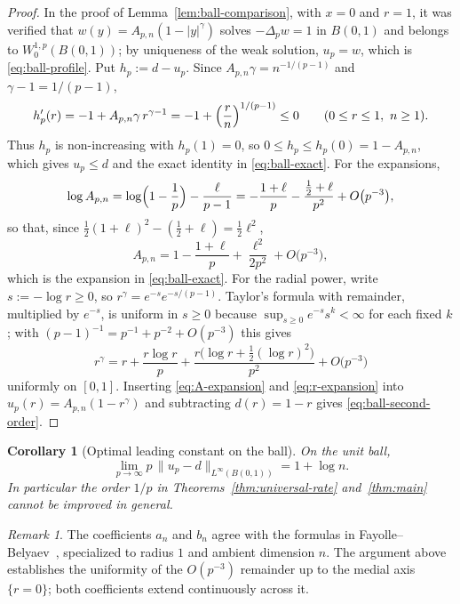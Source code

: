 \documentclass[11pt]{article}
\newcommand{\abs}[1]{\lvert #1\rvert}
\newcommand{\norm}[1]{\lVert #1\rVert}
\newtheorem{corollary}[theorem]{Corollary}
\theoremstyle{definition}
\theoremstyle{remark}
\newtheorem{remark}[theorem]{Remark}
\begin{document}
\begin{proof}
In the proof of Lemma~\ref{lem:ball-comparison}, with $x=0$ and $r=1$, it
was verified that $w(y)=A_{p,n}(1-\abs{y}^{\gamma})$ solves $-\Delta_pw=1$ in
$B(0,1)$ and belongs to $W^{1,p}_0(B(0,1))$; by uniqueness of the weak
solution, $u_p=w$, which is \eqref{eq:ball-profile}. Put $h_p:=d-u_p$. Since
$A_{p,n}\gamma=n^{-1/(p-1)}$ and $\gamma-1=1/(p-1)$,
\[
h_p'(r)=-1+A_{p,n}\gamma\,r^{\gamma-1}=-1+\Bigl(\frac rn\Bigr)^{1/(p-1)}\le0
\qquad(0\le r\le1,\ n\ge1).
\]
Thus $h_p$ is non-increasing with $h_p(1)=0$, so $0\le h_p\le h_p(0)=1-A_{p,n}$,
which gives $u_p\le d$ and the exact identity in \eqref{eq:ball-exact}. For
the expansions,
\[
\log A_{p,n}=\log\Bigl(1-\frac1p\Bigr)-\frac{\ell}{p-1}
=-\frac{1+\ell}{p}-\frac{\tfrac12+\ell}{p^{2}}+O\bigl(p^{-3}\bigr),
\]
so that, since $\tfrac12(1+\ell)^2-(\tfrac12+\ell)=\tfrac12\ell^{2}$,
\begin{equation}\label{eq:A-expansion}
A_{p,n}=1-\frac{1+\ell}{p}+\frac{\ell^{2}}{2p^{2}}+O\bigl(p^{-3}\bigr),
\end{equation}
which is the expansion in \eqref{eq:ball-exact}. For the radial power, write
$s:=-\log r\ge0$, so $r^{\gamma}=e^{-s}e^{-s/(p-1)}$. Taylor's formula with
remainder, multiplied by $e^{-s}$, is uniform in $s\ge0$ because
$\sup_{s\ge0}e^{-s}s^{k}<\infty$ for each fixed $k$; with
$(p-1)^{-1}=p^{-1}+p^{-2}+O(p^{-3})$ this gives
\begin{equation}\label{eq:r-expansion}
r^{\gamma}=r+\frac{r\log r}{p}
+\frac{r\bigl(\log r+\tfrac12(\log r)^{2}\bigr)}{p^{2}}+O\bigl(p^{-3}\bigr)
\end{equation}
uniformly on $[0,1]$. Inserting \eqref{eq:A-expansion} and
\eqref{eq:r-expansion} into $u_p(r)=A_{p,n}(1-r^{\gamma})$ and subtracting
$d(r)=1-r$ gives \eqref{eq:ball-second-order}.
\end{proof}

\begin{corollary}[Optimal leading constant on the ball]\label{cor:ball-constant}
On the unit ball,
\[
\lim_{p\to\infty}p\,\norm{u_p-d}_{L^\infty(B(0,1))}=1+\log n .
\]
In particular the order $1/p$ in Theorems~\ref{thm:universal-rate}
and~\ref{thm:main} cannot be improved in general.
\end{corollary}

\begin{remark}\label{rem:FB-comparison}
The coefficients $a_n$ and $b_n$ agree with the formulas in
Fayolle--Belyaev~\cite[Appendix~B]{FB2026}, specialized to radius $1$ and
ambient dimension $n$. The argument above establishes the uniformity of the
$O(p^{-3})$ remainder up to the medial axis $\{r=0\}$; both coefficients
extend continuously across it.
\end{remark}
\end{document}
